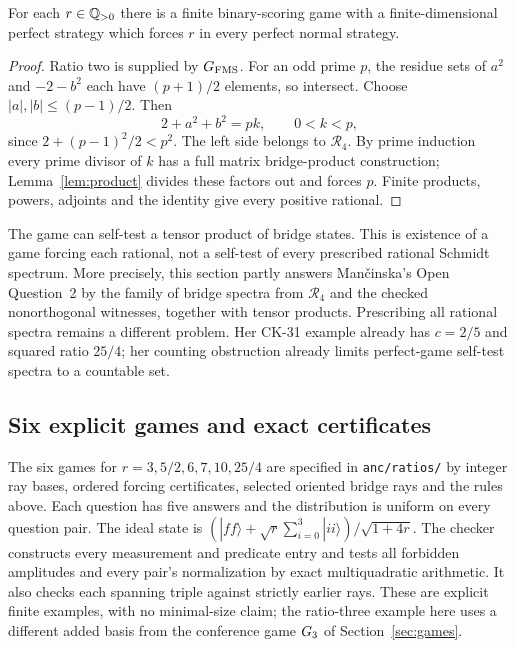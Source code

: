 \begin{theorem}\label{thm:rationals}
For each $r\in\mathbb Q_{>0}$ there is a finite binary-scoring game with a finite-dimensional perfect strategy which forces $r$ in every perfect normal strategy.
\end{theorem}
\begin{proof}
Ratio two is supplied by $G_{\mathrm{FMS}}$. For an odd prime $p$, the residue sets of $a^2$ and $-2-b^2$ each have $(p+1)/2$ elements, so intersect. Choose $|a|,|b|\le(p-1)/2$. Then
\[
 2+a^2+b^2=pk,\qquad 0<k<p,
\]
since $2+(p-1)^2/2<p^2$. The left side belongs to $\mathcal R_4$. By prime induction every prime divisor of $k$ has a full matrix bridge-product construction; Lemma~\ref{lem:product} divides these factors out and forces $p$. Finite products, powers, adjoints and the identity give every positive rational.
\end{proof}
The game can self-test a tensor product of bridge states. This is existence of a game forcing each rational, not a self-test of every prescribed rational Schmidt spectrum. More precisely, this section partly answers Man\v cinska's Open Question~2 \cite{FMS} by the family of bridge spectra from $\mathcal R_4$ and the checked nonorthogonal witnesses, together with tensor products. Prescribing all rational spectra remains a different problem. Her CK-31 example already has $c=2/5$ and squared ratio $25/4$; her counting obstruction already limits perfect-game self-test spectra to a countable set.

\subsection{Six explicit games and exact certificates}
The six games for $r=3,5/2,6,7,10,25/4$ are specified in \texttt{anc/ratios/} by integer ray bases, ordered forcing certificates, selected oriented bridge rays and the rules above. Each question has five answers and the distribution is uniform on every question pair. The ideal state is $(|ff\rangle+\sqrt r\sum_{i=0}^3|ii\rangle)/\sqrt{1+4r}$. The checker constructs every measurement and predicate entry and tests all forbidden amplitudes and every pair's normalization by exact multiquadratic arithmetic. It also checks each spanning triple against strictly earlier rays. These are explicit finite examples, with no minimal-size claim; the ratio-three example here uses a different added basis from the conference game $G_3$ of Section~\ref{sec:games}.

